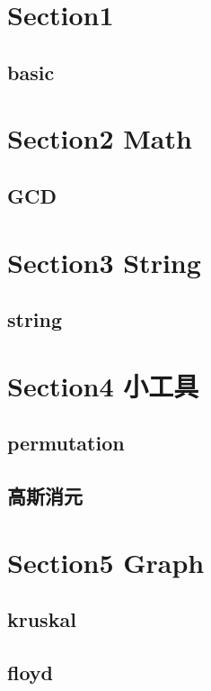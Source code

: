 \section{Section1}
    \subsection{basic}
        
        
\section{Section2 Math}
    \subsection{GCD}
            

\section{Section3 String}
    \subsection{string}
        

\section{Section4 小工具}
    \subsection{permutation}
        
    \subsection{高斯消元}
        

\section{Section5 Graph}
    \subsection{kruskal}
        
    \subsection{floyd}
        
